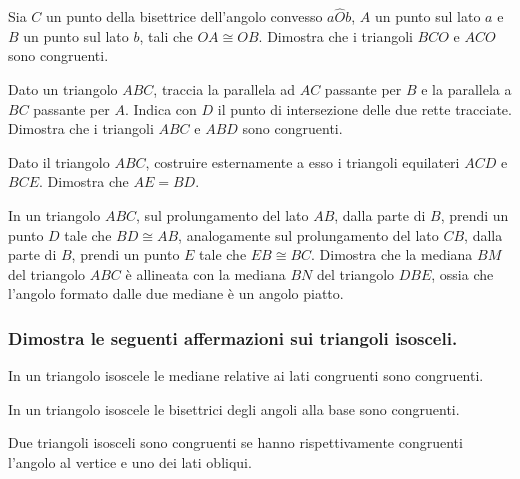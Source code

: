 \begin{multicols}{2}
\begin{esercizio}
\label{ese:2.24}
Sia \(C\) un punto della bisettrice dell'angolo convesso 
\(a\widehat{O}b\), \(A\) un punto sul lato \(a\) e \(B\) un punto sul lato 
\(b\), tali che \(OA\cong OB\). Dimostra che i triangoli \(BCO\) e \(ACO\) 
sono congruenti.
\end{esercizio}

\begin{esercizio}
\label{ese:2.25}
Dato un triangolo \(ABC\), traccia la parallela ad \(AC\) passante per 
\(B\) e la parallela a \(BC\) passante per \(A\). Indica con \(D\) il punto 
di intersezione delle due rette tracciate. Dimostra che i triangoli 
\(ABC\) e \(ABD\) sono congruenti.
\end{esercizio}

\begin{esercizio}
\label{ese:2.26}
Dato il triangolo \(ABC\), costruire esternamente a esso i triangoli 
equilateri \(ACD\) e \(BCE\). Dimostra che \(AE=BD\).
\end{esercizio}

\begin{esercizio}
\label{ese:2.27}
In un triangolo \(ABC\), sul prolungamento del lato \(AB\), dalla parte 
di \(B\), prendi un punto \(D\) tale che \(BD\cong AB\), analogamente sul 
prolungamento del lato \(CB\), dalla parte di \(B\), prendi un punto \(E\) 
tale che \(EB\cong BC\). Dimostra che la mediana \(BM\) del triangolo 
\(ABC\) è allineata con la mediana \(BN\) del triangolo \(DBE\), ossia che 
l'angolo formato dalle due mediane è un angolo piatto.
\end{esercizio}

\subsubsection*{Dimostra le seguenti affermazioni sui triangoli 
isosceli.}

\begin{esercizio}
\label{ese:2.28}
In un triangolo isoscele le mediane relative ai lati congruenti sono 
congruenti. 
\end{esercizio}

\begin{esercizio}
\label{ese:2.29}
In un triangolo isoscele le bisettrici degli angoli alla base sono 
congruenti. 
\end{esercizio}

\begin{esercizio}
\label{ese:2.30}
Due triangoli isosceli sono congruenti se hanno rispettivamente 
congruenti l'angolo al vertice e uno dei lati obliqui.
\end{esercizio}


\end{multicols}
